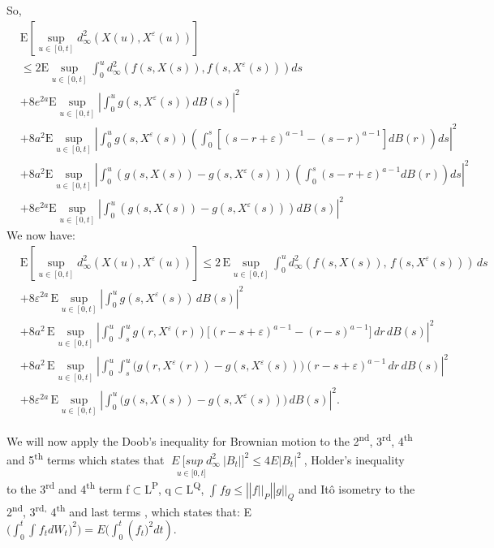 \documentclass[12pt,a4paper]{report}
\numberwithin{equation}{section}
\begin{document}
So,
$$
\begin{aligned}
& \mathrm{E} \left[ \sup_{u \in [0,t]} d_{\infty}^{2} \left( X(u), X^{\varepsilon}(u) \right) \right] \\
& \leq 2\mathrm{E} \sup_{u \in [0,t]} \int_{0}^{u} d_{\infty}^{2} \left( f(s, X(s)), f(s, X^{\varepsilon}(s)) \right) ds \\
& + 8e^{2a} \mathrm{E} \sup_{u \in [0,t]} \left| \int_{0}^{u} g\left( s, X^{\varepsilon}(s) \right) dB(s) \right|^{2} \\
& + 8a^{2} \mathrm{E} \sup_{u \in [0,t]} \left| \int_{0}^{u} g\left( s, X^{\varepsilon}(s) \right) \left( \int_{0}^{s} \left[ (s - r + \varepsilon)^{a - 1} - (s - r)^{a - 1} \right] dB(r) \right) ds \right|^{2} \\
& + 8a^{2} \mathrm{E} \sup_{u \in [0,t]} \left| \int_{0}^{u} \left( g\left( s, X(s) \right) - g(s, X^{\varepsilon}(s)) \right) \left( \int_{0}^{s} (s - r + \varepsilon)^{a - 1} dB(r) \right) ds \right|^{2} \\
& + 8e^{2a} \mathrm{E} \sup_{u \in [0,t]} \left| \int_{0}^{u} \left( g(s, X(s)) - g\left( s, X^{\varepsilon}(s) \right) \right) dB(s) \right|^{2}
\end{aligned}
$$
We now have:
\[
\begin{aligned}
&\mathrm{E}\!\left[\sup_{u\in[0,t]} d_{\infty}^{2}\!\left(X(u),X^{\varepsilon}(u)\right)\right]
\le 2\,\mathrm{E}\!\sup_{u\in[0,t]}\int_{0}^{u} d_{\infty}^{2}\!\left(f(s,X(s)),\,f\!\left(s,X^{\varepsilon}(s)\right)\right)\,ds \\
&+ 8\varepsilon^{2a}\,\mathrm{E}\!\sup_{u\in[0,t]}\left|\int_{0}^{u} g\!\left(s,X^{\varepsilon}(s)\right)\,dB(s)\right|^{2} \\
&+ 8a^{2}\,\mathrm{E}\!\sup_{u\in[0,t]}\left|\int_{0}^{u}\int_{s}^{u} g\!\left(r,X^{\varepsilon}(r)\right)
\Big[(r-s+\varepsilon)^{a-1}-(r-s)^{a-1}\Big]\,dr\,dB(s)\right|^{2} \\
&+ 8a^{2}\,\mathrm{E}\!\sup_{u\in[0,t]}\left|\int_{0}^{u}\int_{s}^{u}\Big(g\!\left(r,X^{\varepsilon}(r)\right)-g\!\left(s,X^{\varepsilon}(s)\right)\Big)
(r-s+\varepsilon)^{a-1}\,dr\,dB(s)\right|^{2} \\
&+ 8\varepsilon^{2a}\,\mathrm{E}\!\sup_{u\in[0,t]}\left|\int_{0}^{u}\Big(g(s,X(s))-g\!\left(s,X^{\varepsilon}(s)\right)\Big)\,dB(s)\right|^{2}.
\end{aligned}
\]




We will now apply the Doob's inequality for Brownian motion to the
2\textsuperscript{nd}, 3\textsuperscript{rd}, 4\textsuperscript{th} and
5\textsuperscript{th} terms which states that
\(\underset{\ \ \ \ \ u \in \lbrack 0,t\rbrack}{E\ \lbrack sup}{d_{\infty}^{2}\ |B_{t}|\rbrack^{2} \leq 4E|B_{t}|^{2}\ }\),
Holder's inequality to the 3\textsuperscript{rd} and
4\textsuperscript{th} term f$\subset$L\textsuperscript{P},
q$\subset$L\textsuperscript{Q},
\(\int_{}^{}{fg \leq |\left| f{||}_{P} \right||g{||}_{Q}}\) and Itô
isometry to the 2\textsuperscript{nd}, 3\textsuperscript{rd,}
4\textsuperscript{th} and last terms , which states that:
E\((\int_{0}^{t}{\int_{}^{}{f_{t}{dW}_{t})^{2}) =}}E(\int_{0}^{t}\left( f_{t})^{2}dt \right).\)
\end{document}
